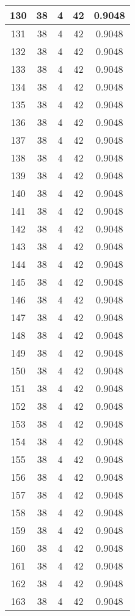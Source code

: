 \documentclass[letterpaper, 12pt]{article}
\begin{document}
\begin{longtable}{|c|c|c|c|c|}
\hline
130 & 38 & 4 & 42 & 0.9048 \\
\hline
131 & 38 & 4 & 42 & 0.9048 \\
\hline
132 & 38 & 4 & 42 & 0.9048 \\
\hline
133 & 38 & 4 & 42 & 0.9048 \\
\hline
134 & 38 & 4 & 42 & 0.9048 \\
\hline
135 & 38 & 4 & 42 & 0.9048 \\
\hline
136 & 38 & 4 & 42 & 0.9048 \\
\hline
137 & 38 & 4 & 42 & 0.9048 \\
\hline
138 & 38 & 4 & 42 & 0.9048 \\
\hline
139 & 38 & 4 & 42 & 0.9048 \\
\hline
140 & 38 & 4 & 42 & 0.9048 \\
\hline
141 & 38 & 4 & 42 & 0.9048 \\
\hline
142 & 38 & 4 & 42 & 0.9048 \\
\hline
143 & 38 & 4 & 42 & 0.9048 \\
\hline
144 & 38 & 4 & 42 & 0.9048 \\
\hline
145 & 38 & 4 & 42 & 0.9048 \\
\hline
146 & 38 & 4 & 42 & 0.9048 \\
\hline
147 & 38 & 4 & 42 & 0.9048 \\
\hline
148 & 38 & 4 & 42 & 0.9048 \\
\hline
149 & 38 & 4 & 42 & 0.9048 \\
\hline
150 & 38 & 4 & 42 & 0.9048 \\
\hline
151 & 38 & 4 & 42 & 0.9048 \\
\hline
152 & 38 & 4 & 42 & 0.9048 \\
\hline
153 & 38 & 4 & 42 & 0.9048 \\
\hline
154 & 38 & 4 & 42 & 0.9048 \\
\hline
155 & 38 & 4 & 42 & 0.9048 \\
\hline
156 & 38 & 4 & 42 & 0.9048 \\
\hline
157 & 38 & 4 & 42 & 0.9048 \\
\hline
158 & 38 & 4 & 42 & 0.9048 \\
\hline
159 & 38 & 4 & 42 & 0.9048 \\
\hline
160 & 38 & 4 & 42 & 0.9048 \\
\hline
161 & 38 & 4 & 42 & 0.9048 \\
\hline
162 & 38 & 4 & 42 & 0.9048 \\
\hline
163 & 38 & 4 & 42 & 0.9048 \\

\end{longtable}
\end{document}
